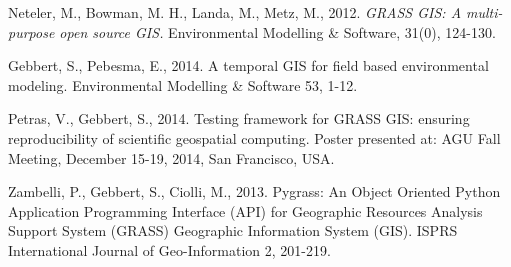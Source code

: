 \documentclass[innermargin=10mm]{tikzposter}
\begin{document}
\begin{columns}
{\begin{thebibliography}{9}
  Neteler, M., Bowman, M. H., Landa, M., Metz, M., 2012.
  \emph{GRASS GIS: A multi-purpose open source GIS.}
  Environmental Modelling \& Software, 31(0), 124-130.

  Gebbert, S., Pebesma, E., 2014. A temporal GIS for field based environmental modeling. Environmental
  Modelling \& Software 53, 1-12.

  Petras, V., Gebbert, S., 2014. Testing framework for GRASS GIS: ensuring reproducibility of scientific
  geospatial computing. Poster presented at: AGU Fall Meeting, December 15-19, 2014, San Francisco, USA.

  Zambelli, P., Gebbert, S., Ciolli, M., 2013. Pygrass: An Object Oriented Python Application Programming
  Interface (API) for Geographic Resources Analysis Support System (GRASS) Geographic Information System
  (GIS). ISPRS International Journal of Geo-Information 2, 201-219.

\end{thebibliography}
}

\end{columns}
\end{document}
